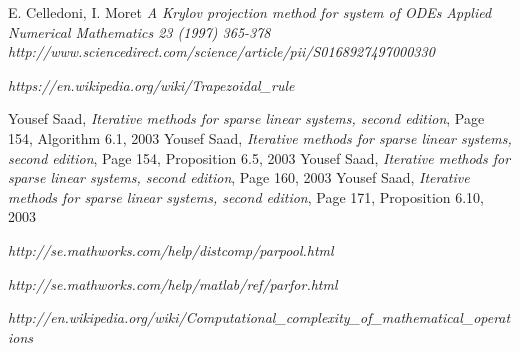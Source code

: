 \newpage
\begin{thebibliography}{9}

    
    E. Celledoni, I. Moret
    \emph{A Krylov projection method for system of ODEs}
    \emph{Applied Numerical Mathematics 23 (1997) 365-378}
    \emph{http://www.sciencedirect.com/science/article/pii/S0168927497000330}
    
    \emph{https://en.wikipedia.org/wiki/Trapezoidal\_rule}

    Yousef Saad,
    \emph{Iterative methods for sparse linear systems, second edition},
    Page 154,
    Algorithm 6.1,
    2003
    Yousef Saad,
    \emph{Iterative methods for sparse linear systems, second edition},
    Page 154,
    Proposition 6.5,
    2003
    Yousef Saad,
    \emph{Iterative methods for sparse linear systems, second edition},
    Page 160,
    2003
    Yousef Saad,
    \emph{Iterative methods for sparse linear systems, second edition},
    Page 171, 
    Proposition 6.10,
    2003
    
    \emph{http://se.mathworks.com/help/distcomp/parpool.html}
    
    \emph{http://se.mathworks.com/help/matlab/ref/parfor.html}
    
    \emph{http://en.wikipedia.org/wiki/Computational\_complexity\_of\_mathematical\_operations}
    
    
\end{thebibliography}

